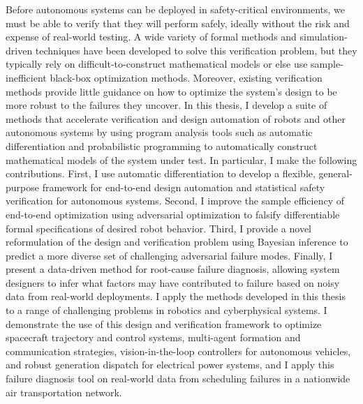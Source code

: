 %
%

Before autonomous systems can be deployed in safety-critical environments, we must be able to verify that they will perform safely, ideally without the risk and expense of real-world testing. A wide variety of formal methods and simulation-driven techniques have been developed to solve this verification problem, but they typically rely on difficult-to-construct mathematical models or else use sample-inefficient black-box optimization methods. Moreover, existing verification methods provide little guidance on how to optimize the system's design to be more robust to the failures they uncover.
%
In this thesis, I develop a suite of methods that accelerate verification and design automation of robots and other autonomous systems by using program analysis tools such as automatic differentiation and probabilistic programming to automatically construct mathematical models of the system under test. In particular, I make the following contributions. First, I use automatic differentiation to develop a flexible, general-purpose framework for end-to-end design automation and statistical safety verification for autonomous systems. Second, I improve the sample efficiency of end-to-end optimization using adversarial optimization to falsify differentiable formal specifications of desired robot behavior. Third, I provide a novel reformulation of the design and verification problem using Bayesian inference to predict a more diverse set of challenging adversarial failure modes. Finally, I present a data-driven method for root-cause failure diagnosis, allowing system designers to infer what factors may have contributed to failure based on noisy data from real-world deployments.
%
I apply the methods developed in this thesis to a range of challenging problems in robotics and cyberphysical systems. I demonstrate the use of this design and verification framework to optimize spacecraft trajectory and control systems, multi-agent formation and communication strategies, vision-in-the-loop controllers for autonomous vehicles, and robust generation dispatch for electrical power systems, and I apply this failure diagnosis tool on real-world data from scheduling failures in a nationwide air transportation network.